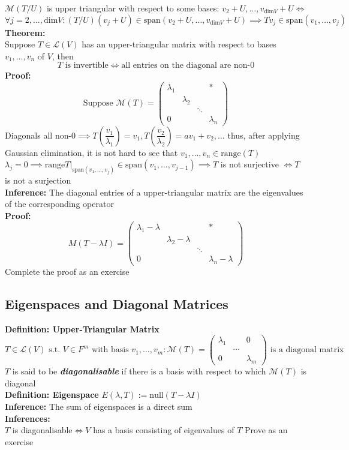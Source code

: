\documentclass{article}
\newcommand{\st}{\mbox{ s.t. }}
\newcommand{\0}{{\bf{0}}}
\begin{document}
$\mathcal{M}(T/U)$ is upper triangular with respect to some bases: $v_2+U,\dots,v_{\mbox{dim}V}+U\iff$
$$\forall j=2,\dots,\mbox{dim}V:(T/U)(v_j+U)\in\mbox{span}(v_2+U,\dots,v_{\mbox{dim}V}+U)\implies Tv_j\in\mbox{span}(v_1,\dots,v_j)$$
\textbf{Theorem:}\\
Suppose $T\in\mathcal{L}(V)$ has an upper-triangular matrix with respect to bases $v_1,\dots,v_n$ of $V$, then
$$T\mbox{ is invertible}\iff\mbox{all entries on the diagonal are non-}0$$
\textbf{Proof:}
$$\mbox{Suppose }\mathcal{M}(T)=\begin{pmatrix}
    \lambda_1&&&*\\
    &\lambda_2&&\\
    &&\ddots&\\
    0&&&\lambda_n
\end{pmatrix}$$
Diagonals all non-0$\implies T\left(\dfrac{v_1}{\lambda_1}\right)=v_1,T\left(\dfrac{v_2}{\lambda_2}\right)=av_1+v_2,\dots$ thus, after applying Gaussian elimination, it is not hard to see that $v_1,\dots,v_n\in\mbox{range}(T)$\\
$\lambda_j=0\implies\mbox{range}T|_{\mbox{span}(v_1,\dots,v_j)}\in\mbox{span}(v_1,\dots,v_{j-1})\implies T$ is not surjective $\iff T$ is not a surjection\\
\textbf{Inference:} The diagonal entries of a upper-triangular matrix are the eigenvalues of the corresponding operator\\
\textbf{Proof:}
$$M(T-\lambda I)=\begin{pmatrix}
    \lambda_1-\lambda&&&*\\
    &\lambda_2-\lambda&&\\
    &&\ddots&\\
    0&&&\lambda_n-\lambda
\end{pmatrix}$$
\null\hfill{Complete the proof as an exercise}
\subsection{Eigenspaces and Diagonal Matrices}
\textbf{Definition: Upper-Triangular Matrix}
$$T\in\mathcal{L}(V)\st V\in F^m\mbox{ with basis }v_1,\dots,v_m:\mathcal{M}(T)=\begin{pmatrix}
    \lambda_1&&0\\
    &\cdots&\\
    0&&\lambda_m
\end{pmatrix}\mbox{ is a diagonal matrix}$$
$T$ is said to be \textit{\textbf{diagonalisable}} if there is a basis with respect to which $\mathcal{M}(T)$ is diagonal\\
\textbf{Definition: Eigenspace} $E(\lambda,T):=\mbox{null}(T-\lambda I)$\\
\textbf{Inference:} The sum of eigenspaces is a direct sum\\
\textbf{Inferences:}\\
$T$ is diagonalisable$\iff V$ has a basis consisting of eigenvalues of $T$
\null\hfill{Prove as an exercise}
\clearpage
\end{document}
